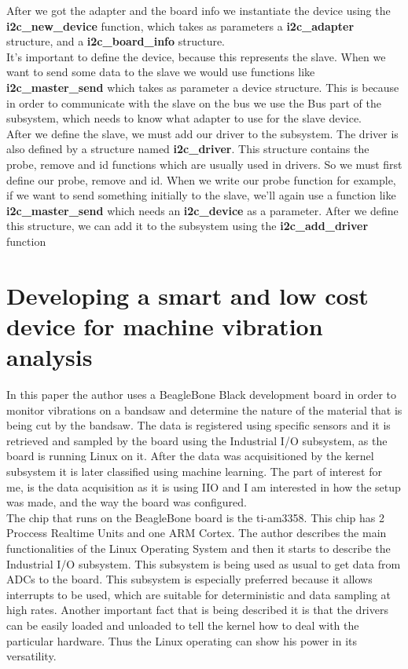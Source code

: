 \documentclass[l2pt, letterpaper]{article}
\begin{document}
After we got the adapter and the board info we instantiate the device using the
\textbf{i2c\_new\_device} function, which takes as parameters a \textbf{i2c\_adapter} structure,
and a \textbf{i2c\_board\_info} structure.\\

It’s important to define the device, because this represents the slave. When we
want to send some data to the slave we would use functions like
\textbf{i2c\_master\_send} which takes as parameter a device structure. This is because
in order to communicate with the slave on the bus we use the Bus part of the
subsystem, which needs to know what adapter to use for the slave device.\\

After we define the slave, we must add our driver to the subsystem. The driver is
also defined by a structure named \textbf{i2c\_driver}. This structure contains the
probe, remove and id functions which are usually used in drivers. So we must
first define our probe, remove and id. When we write our probe function for
example, if we want to send something initially to the slave, we’ll again use a
function like \textbf{i2c\_master\_send} which needs an \textbf{i2c\_device} as a parameter.
After we define this structure, we can add it to the subsystem using the
\textbf{i2c\_add\_driver} function



\section{Developing a smart and low cost device for machine vibration analysis}

In this paper the author uses a BeagleBone Black development board in order to
monitor vibrations on a bandsaw and determine the nature of the material that is
being cut by the bandsaw. The data is registered using specific sensors and it is
retrieved and sampled by the board using the Industrial I/O subsystem, as the
board is running Linux on it. After the data was acquisitioned by the kernel
subsystem it is later classified using machine learning. The part of interest for
me, is the data acquisition as it is using IIO and I am interested in how the setup
was made, and the way the board was configured.\\

The chip that runs on the BeagleBone board is the ti-am3358. This chip has 2
Proccess Realtime Units and one ARM Cortex. The author describes the main
functionalities of the Linux Operating System and then it starts to describe the
Industrial I/O subsystem. This subsystem is being used as usual to get data from
ADCs to the board. This subsystem is especially preferred because it allows
interrupts to be used, which are suitable for deterministic and data sampling at
high rates. Another important fact that is being described it is that the drivers
can be easily loaded and unloaded to tell the kernel how to deal with the
particular hardware. Thus the Linux operating can show his power in its
versatility.\\
\end{document}
